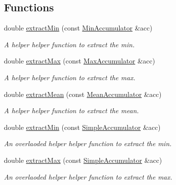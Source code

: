 \subsection*{Functions}
\begin{DoxyCompactItemize}
\item 
double \hyperlink{namespaceAccumulators_ac0b3251fec13bffecc672a1937401ac6}{extract\+Min} (const \hyperlink{namespaceAccumulators_a475b123bb5929d13a2f78b40f43a1257}{Min\+Accumulator} \&acc)
\begin{DoxyCompactList}\small\item\em A helper helper function to extract the min. \end{DoxyCompactList}\item 
double \hyperlink{namespaceAccumulators_a298ea3ee8758a98b37ed8b8b7a022ba7}{extract\+Max} (const \hyperlink{namespaceAccumulators_ae68012df9b3c9adaca0807437b8b0129}{Max\+Accumulator} \&acc)
\begin{DoxyCompactList}\small\item\em A helper helper function to extract the max. \end{DoxyCompactList}\item 
double \hyperlink{namespaceAccumulators_a42a703c5c61fedbdd8aecd2e558a4467}{extract\+Mean} (const \hyperlink{namespaceAccumulators_a42d249e1cf4e4f6c496ab61b7372cf4a}{Mean\+Accumulator} \&acc)
\begin{DoxyCompactList}\small\item\em A helper helper function to extract the mean. \end{DoxyCompactList}\item 
double \hyperlink{namespaceAccumulators_aaf73f870f07e3daaef9259f4f05f9879}{extract\+Min} (const \hyperlink{namespaceAccumulators_aed31f3acda76edc1d58c2bcb479a7aec}{Simple\+Accumulator} \&acc)
\begin{DoxyCompactList}\small\item\em An overlaoded helper helper function to extract the min. \end{DoxyCompactList}\item 
double \hyperlink{namespaceAccumulators_ad2a34538b20bf4420510e3f67c36f75a}{extract\+Max} (const \hyperlink{namespaceAccumulators_aed31f3acda76edc1d58c2bcb479a7aec}{Simple\+Accumulator} \&acc)
\begin{DoxyCompactList}\small\item\em An overlaoded helper helper function to extract the max. \end{DoxyCompactList}\item 

\end{DoxyCompactItemize}
